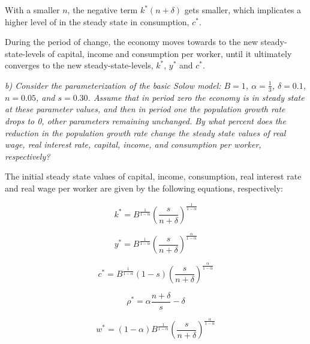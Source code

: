 \documentclass[11pt]{article} %
\begin{document}
With a smaller $n$, the negative term $k^*(n+\delta)$ gets smaller, which implicates a higher level of in the steady state in consumption, $c^*$.\par

During the period of change, the economy moves towards to the new steady-state-levels of capital, income and consumption per worker, until it ultimately converges to the new steady-state-levels, $k^*$, $y^*$ and $c^*$.\par

\pagebreak

\par
\noindent \textit{b) Consider the parameterization of the basic Solow model: $B = 1$, $\alpha = \frac{1}{3}$,  $\delta = 0.1$,
$n = 0.05$, and $s = 0.30$. Assume that in period zero the economy is in steady state at these parameter values, and then in period one the population growth rate drops to 0, other parameters remaining unchanged. By what percent does the reduction in the population growth rate change the steady state values of real wage, real interest rate, capital, income, and consumption per worker, respectively?}\par

The initial steady state values of capital, income, consumption, real interest rate and real wage per worker are given by the following equations, respectively:\par

\begin{equation}
    k^*=B^{\frac{1}{1-\alpha}}({\frac{s}{n+\delta}})^\frac{1}{1-\alpha}
\end{equation}

\begin{equation}
    y^*=B^{\frac{1}{1-\alpha}}({\frac{s}{n+\delta}})^\frac{\alpha}{1-\alpha}
\end{equation}

\begin{equation}
    c^*=B^{\frac{1}{1-\alpha}}(1-s)({\frac{s}{n+\delta}})^\frac{\alpha}{1-\alpha}
\end{equation}

\begin{equation}
    \rho^*=\alpha\frac{n+\delta}{s}-\delta
\end{equation}

\begin{equation}
    w^*=(1-\alpha)B^{\frac{1}{1-\alpha}}({\frac{s}{n+\delta}})^\frac{\alpha}{1-\alpha}
\end{equation}
\end{document}
